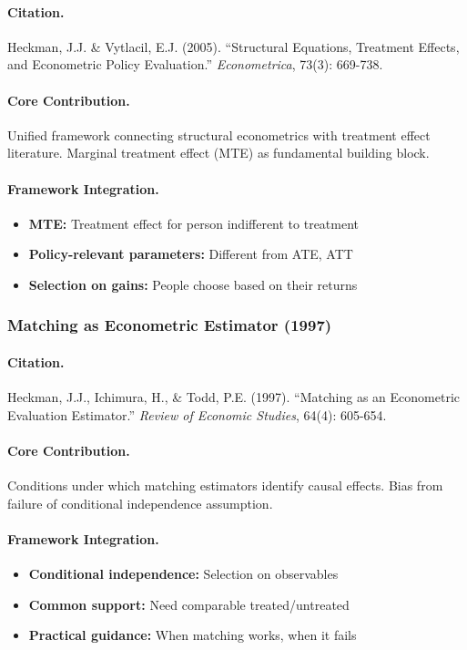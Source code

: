 \paragraph{Citation.}
Heckman, J.J. \& Vytlacil, E.J. (2005). ``Structural Equations, Treatment
Effects, and Econometric Policy Evaluation.'' \emph{Econometrica}, 73(3): 669-738.

\paragraph{Core Contribution.}
Unified framework connecting structural econometrics with treatment effect
literature. Marginal treatment effect (MTE) as fundamental building block.

\paragraph{Framework Integration.}
\begin{itemize}
  \item \textbf{MTE:} Treatment effect for person indifferent to treatment
  \item \textbf{Policy-relevant parameters:} Different from ATE, ATT
  \item \textbf{Selection on gains:} People choose based on their returns
\end{itemize}

\subsubsection{Matching as Econometric Estimator (1997)}

\paragraph{Citation.}
Heckman, J.J., Ichimura, H., \& Todd, P.E. (1997). ``Matching as an
Econometric Evaluation Estimator.'' \emph{Review of Economic Studies}, 64(4): 605-654.

\paragraph{Core Contribution.}
Conditions under which matching estimators identify causal effects.
Bias from failure of conditional independence assumption.

\paragraph{Framework Integration.}
\begin{itemize}
  \item \textbf{Conditional independence:} Selection on observables
  \item \textbf{Common support:} Need comparable treated/untreated
  \item \textbf{Practical guidance:} When matching works, when it fails
\end{itemize}

